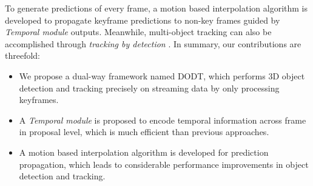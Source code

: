\documentclass[a4paper, 10pt, conference]{ieeeconf}      %
\def\figurename{\emph{Figure}}
\begin{document}
To generate predictions of every frame, a motion based interpolation algorithm is developed to propagate keyframe predictions to non-key frames guided by \textit{Temporal module} outputs. Meanwhile, multi-object tracking can also be accomplished through \textit{tracking by detection} \cite{lenz2015followme}. In summary, our contributions are threefold:
\begin{itemize}
	\item We propose a dual-way framework named DODT,  which performs 3D object detection and tracking precisely on streaming data by only processing keyframes.
	\item A \textit{Temporal module} is proposed to encode temporal information across frame in proposal level, which is much efficient than previous approaches.
	\item A motion based interpolation algorithm is developed for prediction propagation, which leads to considerable performance improvements in object detection and tracking.  
\end{itemize}




\end{document}
